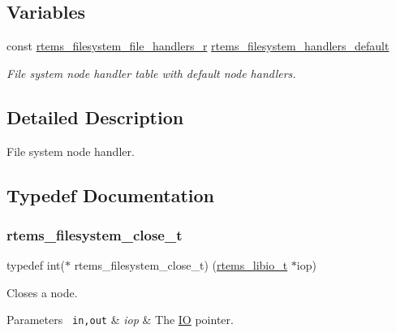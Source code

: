 \subsection*{Variables}
\begin{DoxyCompactItemize}
\item 
\mbox{\label{group__LibIOFSHandler_ga8433aa296d887c411d5ab8adc491ffe6}} 
const \mbox{\hyperlink{struct__rtems__filesystem__file__handlers__r}{rtems\+\_\+filesystem\+\_\+file\+\_\+handlers\+\_\+r}} \mbox{\hyperlink{group__LibIOFSHandler_ga8433aa296d887c411d5ab8adc491ffe6}{rtems\+\_\+filesystem\+\_\+handlers\+\_\+default}}
\begin{DoxyCompactList}\small\item\em File system node handler table with default node handlers. \end{DoxyCompactList}\end{DoxyCompactItemize}


\subsection{Detailed Description}
File system node handler. 



\subsection{Typedef Documentation}
\mbox{\label{group__LibIOFSHandler_ga9c520e776b733893afba2997e163c8af}} 
\subsubsection{\texorpdfstring{rtems\_filesystem\_close\_t}{rtems\_filesystem\_close\_t}}
{\footnotesize\ttfamily typedef int($\ast$ rtems\+\_\+filesystem\+\_\+close\+\_\+t) (\mbox{\hyperlink{structrtems__libio__tt}{rtems\+\_\+libio\+\_\+t}} $\ast$iop)}



Closes a node. 


\begin{DoxyParams}[1]{Parameters}
\mbox{\texttt{ in,out}}  & {\em iop} & The \mbox{\hyperlink{structIO}{IO}} pointer.\\
\hline
\end{DoxyParams}

